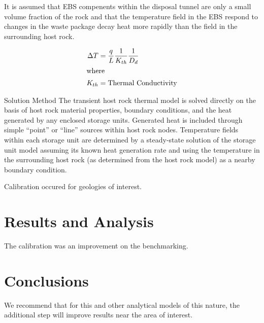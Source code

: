 \documentclass{anstrans}
\begin{document}









It is assumed that \gls{EBS} compenents within the disposal tunnel are only a 
small volume fraction of the rock and that the temperature field in the \gls{EBS} 
respond to changes in the waste package decay heat more rapidly than the field 
in the surrounding host rock.

\begin{align}
  \Delta T &= \frac{q}{L} \frac{1}{K_{th}}\frac{1}{D_d}\\
  \intertext{where}
  K_{th} &= \mbox{Thermal Conductivity}
  \label{deltat}
\end{align}







Solution Method
The transient host rock thermal model is solved directly on the basis of host 
rock material properties, boundary conditions, and the heat generated by any 
enclosed storage units. Generated heat is included through simple “point” or 
“line” sources within host rock nodes.  Temperature fields within each storage 
unit are determined by a steady-state solution of the storage unit model 
assuming its known heat generation rate and using the temperature in the 
surrounding host rock (as determined from the host rock model) as a nearby 
boundary condition. 

Calibration occured for geologies of interest.  


\section{Results and Analysis}





The calibration was an improvement on the benchmarking.

\section{Conclusions}

We recommend that for this and other analytical models of this nature, the 
additional step will improve results near the area of interest.



\end{document}
